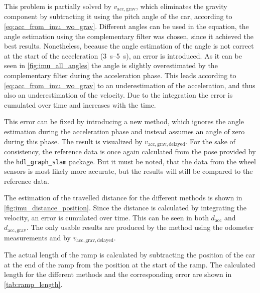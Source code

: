 This problem is partially solved by $v_\mathrm{acc, grav}$, which eliminates the gravity component by subtracting it using the pitch angle of the car, according to \cref{eq:acc_from_imu_wo_grav}.
Different angles can be used in the equation, the angle estimation using the complementary filter was chosen, since it achieved the best results.
Nonetheless, because the angle estimation of the angle is not correct at the start of the acceleration (\SIrange{3}{5}{\second}), an error is introduced.
As it can be seen in \cref{fig:imu_all_angles} the angle is slightly overestimated by the complementary filter during the acceleration phase.
This leads according to \cref{eq:acc_from_imu_wo_grav} to an underestimation of the acceleration, and thus also an underestimation of the velocity.
Due to the integration the error is cumulated over time and increases with the time.\par
This error can be fixed by introducing a new method, which ignores the angle estimation during the acceleration phase and instead assumes an angle of zero during this phase.
The result is visualized by $v_\mathrm{acc, grav, delayed}$.
For the sake of consistency, the reference data is once again calculated from the pose provided by the \texttt{hdl\_graph\_slam} package.
But it must be noted, that the data from the wheel sensors is most likely more accurate, but the results will still be compared to the reference data.\par
The estimation of the travelled distance for the different methods is shown in \cref{fig:imu_distance_position}.
Since the distance is calculated by integrating the velocity, an error is cumulated over time.
This can be seen in both $d_\mathrm{acc}$ and $d_\mathrm{acc, grav}$.
The only usable results are produced by the method using the odometer measurements and by $v_\mathrm{acc, grav, delayed}$.\par
The actual length of the ramp is calculated by subtracting the position of the car at the end of the ramp from the position at the start of the ramp.
The calculated length for the different methods and the corresponding error are shown in \cref{tab:ramp_length}.
